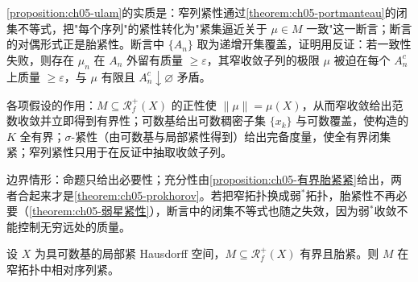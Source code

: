 \documentclass[../../main.tex]{subfiles}%
\begin{document}
\begin{remark}\label{remark:ch05-ulam动机}
\cref{proposition:ch05-ulam}的实质是：窄列紧性通过\cref{theorem:ch05-portmanteau}的闭集不等式，把"每个序列"的紧性转化为"紧集逼近关于 $\mu\in M$ 一致"这一断言；断言的对偶形式正是胎紧性。断言中 $\{A_n\}$ 取为递增开集覆盖，证明用反证：若一致性失败，则存在 $\mu_n$ 在 $A_n$ 外留有质量 $\geqslant\varepsilon$，其窄收敛子列的极限 $\mu$ 被迫在每个 $A_n^c$ 上质量 $\geqslant\varepsilon$，与 $\mu$ 有限且 $A_n^c\downarrow\varnothing$ 矛盾。

各项假设的作用：$M\subseteq\mathscr{R}^+_f(X)$ 的正性使 $\|\mu\|=\mu(X)$，从而窄收敛给出范数收敛并立即得到有界性；可数基给出可数稠密子集 $\{x_k\}$ 与可数覆盖，使构造的 $K$ 全有界；$\sigma$-紧性（由可数基与局部紧性得到）给出完备度量，使全有界闭集紧；窄列紧性只用于在反证中抽取收敛子列。

边界情形：命题只给出必要性；充分性由\cref{proposition:ch05-有界胎紧紧}给出，两者合起来才是\cref{theorem:ch05-prokhorov}。若把窄拓扑换成弱$^*$拓扑，胎紧性不再必要（\cref{theorem:ch05-弱星紧性}），断言中的闭集不等式也随之失效，因为弱$^*$收敛不能控制无穷远处的质量。
\end{remark}

\begin{proposition}\label{proposition:ch05-有界胎紧紧}
设 $X$ 为具可数基的局部紧 Hausdorff 空间，$M\subseteq\mathscr{R}^+_f(X)$ 有界且胎紧。则 $M$ 在窄拓扑中相对序列紧。
\end{proposition}
\end{document}
